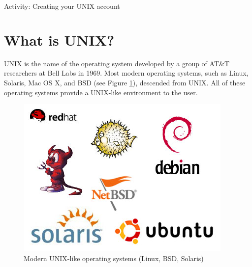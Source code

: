 \begin{frame}{Activity: Creating your UNIX account}
\end{frame}


\section{What is UNIX?} %
UNIX is the name of the operating system developed by a group of AT\&T
researchers at Bell Labs in 1969.  Most modern operating systems, such as Linux,
Solaris, Mac OS X, and BSD (see Figure \ref{fig:modern}), descended from UNIX.
All of these operating systems provide a UNIX-like environment to the user. 

\begin{frame}
\begin{figure}
\begin{center}\includegraphics[width=0.7\linewidth]{unix_logos}\end{center}
\caption{Modern UNIX-like operating systems (Linux, BSD, Solaris)}
\label{fig:modern}
\end{figure}
\end{frame}

